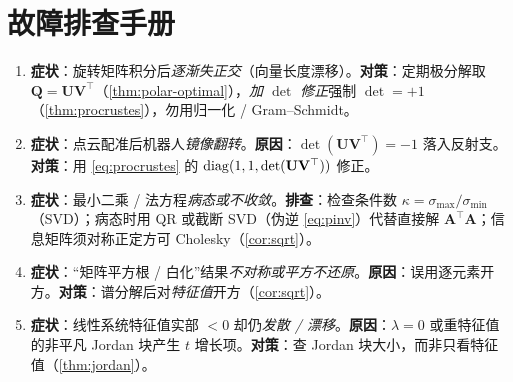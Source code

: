 \section*{故障排查手册}
\begin{enumerate}
  \item \textbf{症状}：旋转矩阵积分后\emph{逐渐失正交}（向量长度漂移）。\textbf{对策}：定期极分解取 $\mathbf{Q}=\mathbf{U}\mathbf{V}^\top$（\cref{thm:polar-optimal}），\emph{加 $\det$ 修正}强制 $\det=+1$（\cref{thm:procrustes}），勿用归一化 / Gram--Schmidt。
  \item \textbf{症状}：点云配准后机器人\emph{镜像翻转}。\textbf{原因}：$\det(\mathbf{U}\mathbf{V}^\top)=-1$ 落入反射支。\textbf{对策}：用 \cref{eq:procrustes} 的 $\operatorname{diag}(1,1,\det(\mathbf{U}\mathbf{V}^\top))$ 修正。
  \item \textbf{症状}：最小二乘 / 法方程\emph{病态或不收敛}。\textbf{排查}：检查条件数 $\kappa=\sigma_{\max}/\sigma_{\min}$（SVD）；病态时用 QR 或截断 SVD（伪逆 \cref{eq:pinv}）代替直接解 $\mathbf{A}^\top\mathbf{A}$；信息矩阵须对称正定方可 Cholesky（\cref{cor:sqrt}）。
  \item \textbf{症状}：“矩阵平方根 / 白化”结果\emph{不对称或平方不还原}。\textbf{原因}：误用逐元素开方。\textbf{对策}：谱分解后对\emph{特征值}开方（\cref{cor:sqrt}）。
  \item \textbf{症状}：线性系统特征值实部 $<0$ 却仍\emph{发散 / 漂移}。\textbf{原因}：$\lambda=0$ 或重特征值的非平凡 Jordan 块产生 $t$ 增长项。\textbf{对策}：查 Jordan 块大小，而非只看特征值（\cref{thm:jordan}）。
\end{enumerate}

